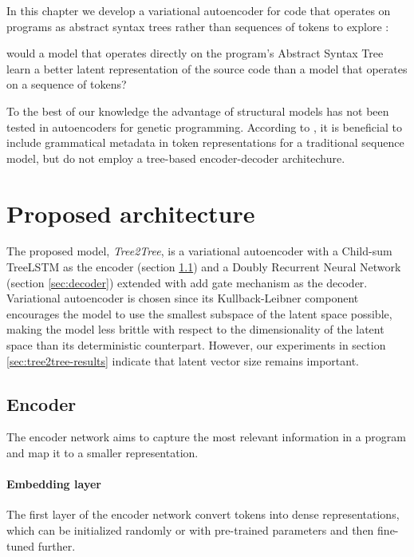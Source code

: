 In this chapter we develop a variational autoencoder for code that operates on programs as abstract syntax trees rather than sequences of tokens to explore \rqtree{}:

\begin{highlight}
    would a model that operates directly on the program's Abstract Syntax Tree learn a better latent representation of the source code than a model that operates on a sequence of tokens?
\end{highlight}

To the best of our knowledge the advantage of structural models has not been tested in autoencoders for genetic programming. 
According to \cite{kusnerGrammarVariationalAutoencoder2017,kostajrProgramSynthesisVulnerability2019}, it is beneficial to include grammatical metadata in token representations for a traditional sequence model, but do not employ a tree-based encoder-decoder architechure.

\newpage
\section{Proposed architecture}

The proposed model, \emph{Tree2Tree}, is a variational autoencoder with a Child-sum TreeLSTM as the encoder (section \ref{sec:encoder}) and a Doubly Recurrent Neural Network (section \ref{sec:decoder}) extended with add gate mechanism as the decoder.
Variational autoencoder \cite{kingmaAutoencodingVariationalBayes2013} is chosen since its Kullback-Leibner component encourages the model to use the smallest subspace of the latent space possible, making the model less brittle with respect to the dimensionality of the latent space than its deterministic counterpart.
However, our experiments in section \ref{sec:tree2tree-results} indicate that latent vector size remains important.

\subsection{Encoder}
\label{sec:encoder}
The encoder network aims to capture the most relevant information in a program and map it to a smaller representation. 

\paragraph{Embedding layer} The first layer of the encoder network convert tokens into dense representations, which can be initialized randomly or with pre-trained parameters and then fine-tuned further.


